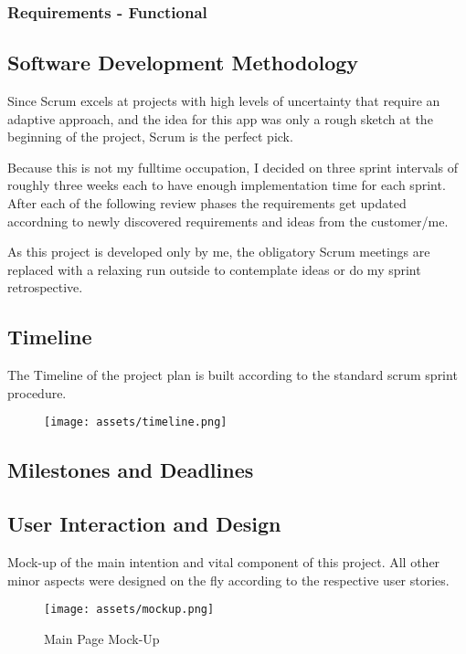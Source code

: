 \subsubsection{Requirements - Functional}


\subsection{Software Development Methodology}
Since Scrum excels at projects with high levels of uncertainty that require an adaptive approach, and the idea for this app was only a rough sketch at the beginning of the project, Scrum is the perfect pick.

Because this is not my fulltime occupation, I decided on three sprint intervals of roughly three weeks each to have enough implementation time for each sprint. After each of the following review phases the requirements get updated accordning to newly discovered requirements and ideas from the customer/me.

As this project is developed only by me, the obligatory Scrum meetings are replaced with a relaxing run outside to contemplate ideas or do my sprint retrospective.

\newpage
\subsection{Timeline}
The Timeline of the project plan is built according to the standard scrum sprint procedure.
\begin{figure}[!h]
    \centering
    \texttt{[image: assets/timeline.png]}
    \label{fig:timeline}
\end{figure}

\subsection{Milestones and Deadlines}


\newpage
\subsection{ User Interaction and Design}

Mock-up of the main intention and vital component of this project. All other minor aspects were designed on the fly according to the respective user stories.
\begin{figure}[!h]
    \centering
    \caption{Main Page Mock-Up}
    \texttt{[image: assets/mockup.png]}
    \label{fig:mockup}
\end{figure}

